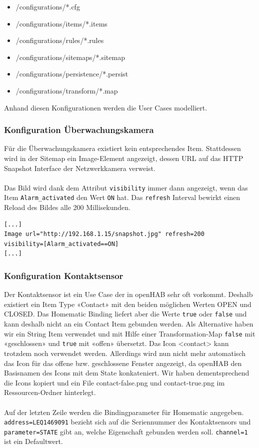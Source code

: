 \begin{itemize}
	\item /configurations/*.cfg
	\item /configurations/items/*.items
	\item /configurations/rules/*.rules
	\item /configurations/sitemaps/*.sitemap
	\item /configurations/persistence/*.persist
	\item /configurations/transform/*.map
\end{itemize}

Anhand diesen Konfigurationen werden die User Cases modelliert.

\subsubsection{Konfiguration Überwachungskamera} 
Für die Überwachungskamera existiert kein entsprechendes Item. Stattdessen wird in der Sitemap ein Image-Element angezeigt, dessen URL auf das HTTP Snapshot Interface der Netzwerkkamera verweist.\\ \\
Das Bild wird dank dem Attribut \lstinline!visibility!  immer dann angezeigt, wenn das Item \lstinline!Alarm_activated! den Wert \lstinline!ON! hat. Das \lstinline!refresh! Interval bewirkt einen Reload des Bildes alle 200 Millisekunden.

\begin{lstlisting}[style=csharp, caption=demo.sitemap - Webcam Bild]
[...]
Image url="http://192.168.1.15/snapshot.jpg" refresh=200
visibility=[Alarm_activated==ON]
[...]
\end{lstlisting}




\subsubsection{Konfiguration Kontaktsensor} 
Der Kontaktsensor ist ein Use Case der in openHAB sehr oft vorkommt. Deshalb existiert ein Item Type «Contact» mit den beiden möglichen Werten OPEN und CLOSED. Das Homematic Binding liefert aber die Werte \lstinline!true! oder \lstinline!false! und kann deshalb nicht an ein Contact Item gebunden werden. Als Alternative haben wir ein String Item verwendet und mit Hilfe einer Transformation-Map \lstinline!false! mit «geschlossen» und \lstinline!true! mit «offen» übersetzt. Das Icon <contact> kann trotzdem noch verwendet werden. Allerdings wird nun nicht mehr automatisch das Icon für das offene bzw. geschlossene Fenster angezeigt, da openHAB den Basisnamen des Icons mit dem State konkateniert. Wir haben dementsprechend die Icons kopiert und ein File contact-false.png und contact-true.png im Ressourcen-Ordner hinterlegt.\\ \\
Auf der letzten Zeile werden die Bindingparameter für Homematic angegeben.\\ \lstinline!address=LEQ1469091! bezieht sich auf die Seriennummer des Kontaktsensors und\\ \lstinline!parameter=STATE! gibt an, welche Eigenschaft gebunden werden soll. \lstinline!channel=1! ist ein Defaultwert.

